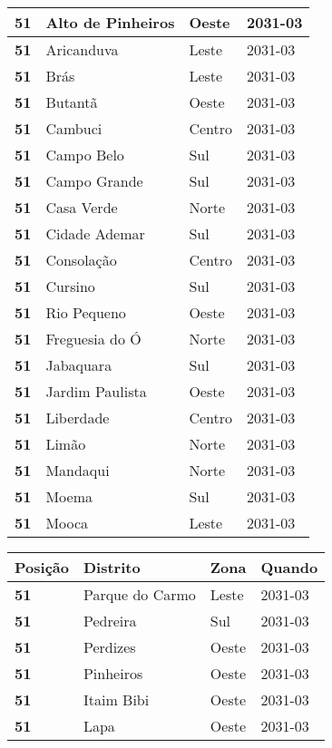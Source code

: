 \begin{table}[H]
\begin{tabular}{l|l|l|l}
		\textbf{51} & Alto de Pinheiros & Oeste & 2031-03\\ \hline
		\textbf{51} & Aricanduva & Leste & 2031-03\\ \hline
		\textbf{51} & Brás & Leste & 2031-03\\ \hline
		\textbf{51} & Butantã & Oeste & 2031-03\\ \hline
		\textbf{51} & Cambuci & Centro & 2031-03\\ \hline
		\textbf{51} & Campo Belo & Sul & 2031-03\\ \hline
		\textbf{51} & Campo Grande & Sul & 2031-03\\ \hline
		\textbf{51} & Casa Verde & Norte & 2031-03\\ \hline
		\textbf{51} & Cidade Ademar & Sul & 2031-03\\ \hline
		\textbf{51} & Consolação & Centro & 2031-03\\ \hline
		\textbf{51} & Cursino & Sul & 2031-03\\ \hline
		\textbf{51} & Rio Pequeno & Oeste & 2031-03\\ \hline
		\textbf{51} & Freguesia do Ó & Norte & 2031-03\\ \hline
		\textbf{51} & Jabaquara & Sul & 2031-03\\ \hline
		\textbf{51} & Jardim Paulista & Oeste & 2031-03\\ \hline
		\textbf{51} & Liberdade & Centro & 2031-03\\ \hline
		\textbf{51} & Limão & Norte & 2031-03\\ \hline
		\textbf{51} & Mandaqui & Norte & 2031-03\\ \hline
		\textbf{51} & Moema & Sul & 2031-03\\ \hline
		\textbf{51} & Mooca & Leste & 2031-03\\ 
	\end{tabular}
\end{table}

\begin{table}[H]
	\centering
	\begin{tabular}{l|l|l|l}
		\textbf{Posição} & \textbf{Distrito} & \textbf{Zona} & \textbf{Quando} \\ \hline
			\textbf{51} & Parque do Carmo & Leste & 2031-03\\ \hline
			\textbf{51} & Pedreira & Sul & 2031-03\\ \hline
			\textbf{51} & Perdizes & Oeste & 2031-03\\ \hline
			\textbf{51} & Pinheiros & Oeste & 2031-03\\ \hline
			\textbf{51} & Itaim Bibi & Oeste & 2031-03\\ \hline
			\textbf{51} & Lapa & Oeste & 2031-03\\ 	
	\end{tabular}
\end{table}

